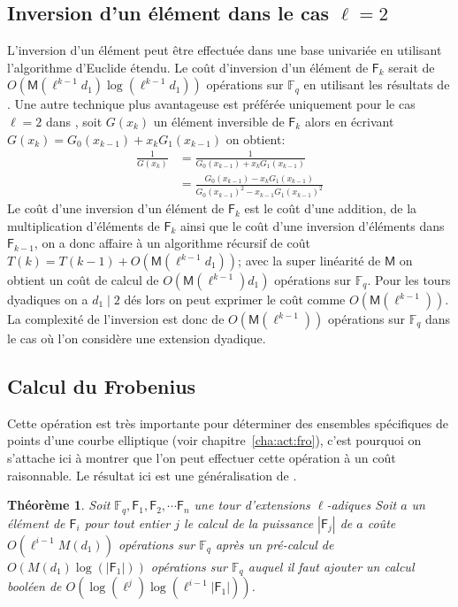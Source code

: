 \documentclass[10pt,a4paper]{book}
\theoremstyle{plain}
\newtheorem{thm}{Théorème}[chapter]
\theoremstyle{definition}
\theoremstyle{definition}
\theoremstyle{definition}
\theoremstyle{definition}
\theoremstyle{definition}
\theoremstyle{remark}
\theoremstyle{remark}
\theoremstyle{definition}
\begin{document}
\subsection*{Inversion d'un élément dans le cas $\ell=2$}


L'inversion d'un élément peut être effectuée dans une base univariée en utilisant l'algorithme d'Euclide étendu. Le coût d'inversion d'un élément de $\mathsf{F}_k$ serait de $O(\mathsf{M}(\ell^{k-1}d_1)\log(\ell^{k-1}d_1))$ opérations sur $\mathbb{F}_q$ en utilisant les résultats de \cite[ch.11]{vzGJG03}. Une autre technique plus avantageuse est préférée uniquement pour le cas $\ell=2$ dans \cite{Doliskani-Schost15}, soit $G(x_k)$ un élément inversible de $\mathsf{F}_k$ alors en écrivant $G(x_k)=G_0(x_{k-1})+x_kG_1(x_{k-1})$ on obtient:
\begin{align*}
\frac{1}{G(x_k)} &=\frac{1}{G_0(x_{k-1})+x_kG_1(x_{k-1})} \\
 				&= \frac{G_0(x_{k-1})-x_kG_1(x_{k-1})}{G_0(x_{k-1})^2-x_{k-1}G_1(x_{k-1})^2}
\end{align*}
Le coût d'une inversion d'un élément de $\mathsf{F}_k$ est le coût d'une addition, de la multiplication d'éléments de $\mathsf{F}_k$ ainsi que le coût d'une inversion d'éléments dans $\mathsf{F}_{k-1}$, on a donc affaire à un algorithme récursif de coût  $T(k)=T(k-1)+O(\mathsf{M}(\ell^{k-1}d_1))$; avec la super linéarité de $\mathsf{M}$ on obtient un coût de calcul de $O(\mathsf{M}(\ell^{k-1})d_1)$ opérations sur $\mathbb{F}_q$. Pour les tours dyadiques on a $d_1 \mid 2$ dés lors on peut exprimer le coût comme $O(\mathsf{M}(\ell^{k-1}))$. La complexité de l'inversion est donc de $O(\mathsf{M}(\ell^{k-1}))$ opérations sur $\mathbb{F}_q$ dans le cas où l'on considère une extension dyadique.

\subsection*{Calcul du Frobenius}

Cette opération est très importante pour déterminer des ensembles spécifiques de points d'une courbe elliptique (voir chapitre~\ref{cha:act:fro}), c'est pourquoi on s'attache ici à montrer que l'on peut effectuer cette opération à un coût raisonnable. Le résultat ici est une généralisation de \cite{Doliskani-Schost15}.

\begin{thm} \label{thm:frob-ell}
Soit $\mathbb{F}_q, \mathsf{F}_1, \mathsf{F}_2,  \cdots \mathsf{F}_n$ une tour d'extensions $\ell$-adiques
Soit $a$ un élément de $\mathsf{F}_i$ pour tout entier $j$ le calcul de la puissance $|\mathsf{F}_j|$ de $a$ coûte
 $O(\ell^{i-1}M(d_1))$ opérations sur $\mathbb{F}_q$ après un pré-calcul de $O( M(d_1)\log(|\mathsf{F}_1|))$ opérations sur $\mathbb{F}_q$
auquel il faut ajouter un calcul booléen de $O(\log(\ell^j)\log(\ell^{i-1}|\mathsf{F}_1|))$.
\end{thm} 
\end{document}
